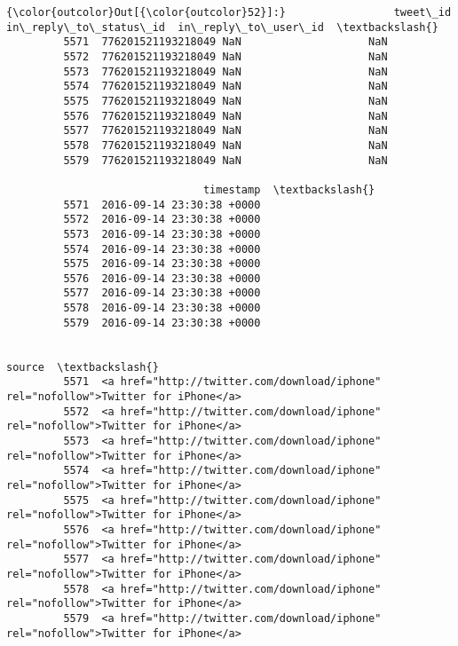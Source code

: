 \documentclass[11pt]{article}
\begin{document}
\begin{Verbatim}[commandchars=\\\{\}]
{\color{outcolor}Out[{\color{outcolor}52}]:}                 tweet\_id  in\_reply\_to\_status\_id  in\_reply\_to\_user\_id  \textbackslash{}
         5571  776201521193218049 NaN                    NaN                    
         5572  776201521193218049 NaN                    NaN                    
         5573  776201521193218049 NaN                    NaN                    
         5574  776201521193218049 NaN                    NaN                    
         5575  776201521193218049 NaN                    NaN                    
         5576  776201521193218049 NaN                    NaN                    
         5577  776201521193218049 NaN                    NaN                    
         5578  776201521193218049 NaN                    NaN                    
         5579  776201521193218049 NaN                    NaN                    
         
                               timestamp  \textbackslash{}
         5571  2016-09-14 23:30:38 +0000   
         5572  2016-09-14 23:30:38 +0000   
         5573  2016-09-14 23:30:38 +0000   
         5574  2016-09-14 23:30:38 +0000   
         5575  2016-09-14 23:30:38 +0000   
         5576  2016-09-14 23:30:38 +0000   
         5577  2016-09-14 23:30:38 +0000   
         5578  2016-09-14 23:30:38 +0000   
         5579  2016-09-14 23:30:38 +0000   
         
                                                                                           source  \textbackslash{}
         5571  <a href="http://twitter.com/download/iphone" rel="nofollow">Twitter for iPhone</a>   
         5572  <a href="http://twitter.com/download/iphone" rel="nofollow">Twitter for iPhone</a>   
         5573  <a href="http://twitter.com/download/iphone" rel="nofollow">Twitter for iPhone</a>   
         5574  <a href="http://twitter.com/download/iphone" rel="nofollow">Twitter for iPhone</a>   
         5575  <a href="http://twitter.com/download/iphone" rel="nofollow">Twitter for iPhone</a>   
         5576  <a href="http://twitter.com/download/iphone" rel="nofollow">Twitter for iPhone</a>   
         5577  <a href="http://twitter.com/download/iphone" rel="nofollow">Twitter for iPhone</a>   
         5578  <a href="http://twitter.com/download/iphone" rel="nofollow">Twitter for iPhone</a>   
         5579  <a href="http://twitter.com/download/iphone" rel="nofollow">Twitter for iPhone</a>   
         

\end{Verbatim}
\end{document}
